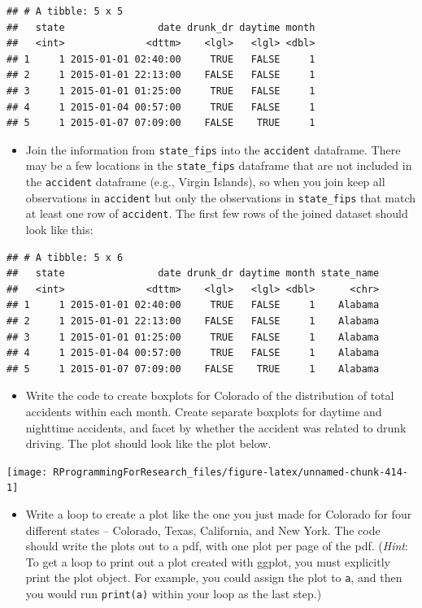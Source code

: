 \documentclass[]{book}
\providecommand{\tightlist}{%
  \setlength{\itemsep}{0pt}\setlength{\parskip}{0pt}}
\theoremstyle{definition}
\theoremstyle{definition}
\theoremstyle{definition}
\theoremstyle{remark}
\begin{document}
\begin{verbatim}
## # A tibble: 5 x 5
##   state                date drunk_dr daytime month
##   <int>              <dttm>    <lgl>   <lgl> <dbl>
## 1     1 2015-01-01 02:40:00     TRUE   FALSE     1
## 2     1 2015-01-01 22:13:00    FALSE   FALSE     1
## 3     1 2015-01-01 01:25:00     TRUE   FALSE     1
## 4     1 2015-01-04 00:57:00     TRUE   FALSE     1
## 5     1 2015-01-07 07:09:00    FALSE    TRUE     1
\end{verbatim}

\begin{itemize}
\tightlist
\item
  Join the information from \texttt{state\_fips} into the
  \texttt{accident} dataframe. There may be a few locations in the
  \texttt{state\_fips} dataframe that are not included in the
  \texttt{accident} dataframe (e.g., Virgin Islands), so when you join
  keep all observations in \texttt{accident} but only the observations
  in \texttt{state\_fips} that match at least one row of
  \texttt{accident}. The first few rows of the joined dataset should
  look like this:
\end{itemize}

\begin{verbatim}
## # A tibble: 5 x 6
##   state                date drunk_dr daytime month state_name
##   <int>              <dttm>    <lgl>   <lgl> <dbl>      <chr>
## 1     1 2015-01-01 02:40:00     TRUE   FALSE     1    Alabama
## 2     1 2015-01-01 22:13:00    FALSE   FALSE     1    Alabama
## 3     1 2015-01-01 01:25:00     TRUE   FALSE     1    Alabama
## 4     1 2015-01-04 00:57:00     TRUE   FALSE     1    Alabama
## 5     1 2015-01-07 07:09:00    FALSE    TRUE     1    Alabama
\end{verbatim}

\begin{itemize}
\tightlist
\item
  Write the code to create boxplots for Colorado of the distribution of
  total accidents within each month. Create separate boxplots for
  daytime and nighttime accidents, and facet by whether the accident was
  related to drunk driving. The plot should look like the plot below.
\end{itemize}

\begin{center}\texttt{[image: RProgrammingForResearch\_files/figure-latex/unnamed-chunk-414-1]} \end{center}

\begin{itemize}
\tightlist
\item
  Write a loop to create a plot like the one you just made for Colorado
  for four different states -- Colorado, Texas, California, and New
  York. The code should write the plots out to a pdf, with one plot per
  page of the pdf. (\emph{Hint}: To get a loop to print out a plot
  created with ggplot, you must explicitly print the plot object. For
  example, you could assign the plot to \texttt{a}, and then you would
  run \texttt{print(a)} within your loop as the last step.)
\end{itemize}
\end{document}
